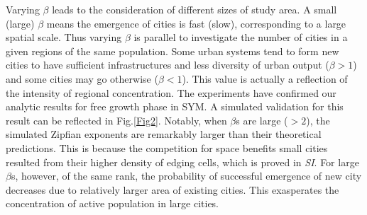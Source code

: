 \documentclass[reprint,unsortedaddress,amsmath,amssymb,aps,prl,showkeys]{revtex4-2}
\begin{document}
Varying $\beta$ leads to the consideration of different sizes of study area. A small (large) $\beta$ means the emergence of cities is fast (slow), corresponding to a large spatial scale. %
Thus varying $\beta$ is parallel to  investigate the number of cities in a given regions of the same population. Some urban systems tend to form new cities to have sufficient infrastructures and less diversity of urban output ($\beta > 1$) and some cities may go otherwise ($\beta< 1$). This value is actually a reflection of the intensity of regional concentration. The experiments have confirmed our analytic results for free growth phase in SYM. %
A simulated validation for this result can be reflected in Fig.\ref{Fig2}. Notably, when $\beta$s are large ($>2$), the simulated Zipfian exponents are remarkably larger than their theoretical predictions. This is because the competition for space benefits small %
cities resulted from their higher density of edging cells, which is proved in \textit{SI}. For large $\beta$s, however, of the same rank, the probability of successful emergence of new city decreases due to relatively larger area of existing cities. This exasperates the concentration of active population in large cities.%
\end{document}
